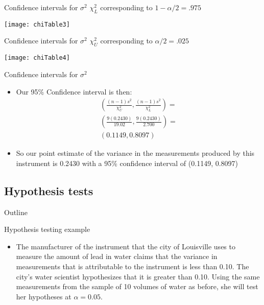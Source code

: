 \documentclass[xcolor=dvipsnames]{beamer}
\begin{document}
\begin{frame}{Confidence intervals for $\sigma^2$}
	$\chi^2_L$ corresponding to $1-\alpha / 2 = .975$
	\begin{center}
		\texttt{[image: chiTable3]}
	\end{center}
\end{frame}

\begin{frame}{Confidence intervals for $\sigma^2$}
	$\chi^2_U$ corresponding to $\alpha / 2 = .025$
	\begin{center}
		\texttt{[image: chiTable4]}
	\end{center}
\end{frame}

\begin{frame}{Confidence intervals for $\sigma^2$}
	\begin{itemize}
		\item Our 95\% Confidence interval is then:
		\begin{gather*}
		\left(\frac{(n-1) s^2}{\chi_U^2}, \frac{(n-1)s^2}{\chi_L^2} \right) = \\
		\left(\frac{9 (0.2430)}{19.02}, \frac{9 (0.2430)}{2.700} \right) = \\
		( 0.1149, 0.8097)
		\end{gather*} \pause
		\item So our point estimate of the variance in the measurements produced by this instrument is 0.2430 with a 95\% confidence interval of (0.1149, 0.8097)
	\end{itemize}
\end{frame}

\subsection{Hypothesis tests}
\begin{frame}{Outline}
	\tableofcontents[currentsection,subsectionstyle=show/shaded/hide]
\end{frame}

\begin{frame}{Hypothesis testing example}
	\begin{itemize}
		\item The manufacturer of the instrument that the city of Louisville uses to measure the amount of lead in water claims that the variance in measurements that is attributable to the instrument is less than 0.10. The city's water scientist hypothesizes that it is greater than 0.10. Using the same measurements from the sample of 10 volumes of water as before, she will test her hypotheses at $\alpha = 0.05$. 
	\end{itemize}
\end{frame}
\end{document}

